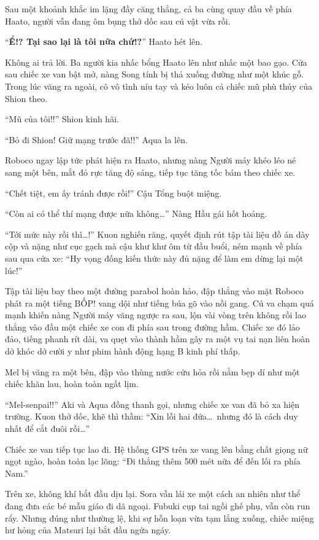 \documentclass[../main.tex]{subfiles}
\begin{document}
Sau một khoảnh khắc im lặng đầy căng thẳng, cả ba cùng quay đầu về phía Haato, người vẫn đang ôm bụng thở dốc sau cú vật vừa rồi.

``\textbf{Ể!? Tại sao lại là tôi nữa chứ!?}'' Haato hét lên.

Không ai trả lời. Ba người kia nhấc bổng Haato lên như nhấc một bao gạo. Cửa sau chiếc xe van bật mở, nàng Song tính bị thả xuống đường như một khúc gỗ. Trong lúc văng ra ngoài, cô vô tình níu tay và kéo luôn cả chiếc mũ phù thủy của Shion theo.

``Mũ của tôi!!'' Shion kinh hãi.

``Bỏ đi Shion! Giữ mạng trước đã!!'' Aqua la lên.

Roboco ngay lập tức phát hiện ra Haato, nhưng nàng Người máy khéo léo né sang một bên, mắt đỏ rực tăng độ sáng, tiếp tục tăng tốc bám theo chiếc xe.

``Chết tiệt, em ấy tránh được rồi!'' Cậu Tổng buột miệng.

``Còn ai có thể thí mạng được nữa không\dots'' Nàng Hầu gái hốt hoảng.

``Tới mức này rồi thì\dots!'' Kuon nghiến răng, quyết định rút tập tài liệu đồ án dày cộp và nặng như cục gạch mà cậu khư khư ôm từ đầu buổi, ném mạnh về phía sau qua cửa xe: ``Hy vọng đống kiến thức này đủ nặng để làm em dừng lại một lúc!''

Tập tài liệu bay theo một đường parabol hoàn hảo, đập thẳng vào mặt Roboco phát ra một tiếng BỐP! vang dội như tiếng búa gõ vào nồi gang. Cú va chạm quá mạnh khiến nàng Người máy văng ngược ra sau, lộn vài vòng trên không rồi lao thẳng vào đầu một chiếc xe con đi phía sau trong đường hầm. Chiếc xe đó lảo đảo, tiếng phanh rít dài, va quẹt vào thành hầm gây ra một vụ tai nạn liên hoàn dở khóc dở cười y như phim hành động hạng B kinh phí thấp.

Mel bị văng ra một bên, đập vào thùng nước cứu hỏa rồi nằm bẹp dí như một chiếc khăn lau, hoàn toàn ngất lịm.

``Mel-senpai!!'' Aki và Aqua đồng thanh gọi, nhưng chiếc xe van đã bỏ xa hiện trường. Kuon thở dốc, khẽ thì thầm: ``Xin lỗi hai đứa\dots\ nhưng đó là cách duy nhất để cắt đuôi rồi\dots''

Chiếc xe van tiếp tục lao đi. Hệ thống GPS trên xe vang lên bằng chất giọng nữ ngọt ngào, hoàn toàn lạc lõng: ``Đi thẳng thêm 500 mét nữa để đến lối ra phía Nam.''

Trên xe, không khí bắt đầu dịu lại. Sora vẫn lái xe một cách an nhiên như thể đang đưa các bé mẫu giáo đi dã ngoại. Fubuki cụp tai ngồi ghế phụ, vẫn còn run rẩy. Nhưng đúng như thường lệ, khi sự hỗn loạn vừa tạm lắng xuống, chiếc miệng hư hỏng của Matsuri lại bắt đầu ngứa ngáy.
\end{document}

